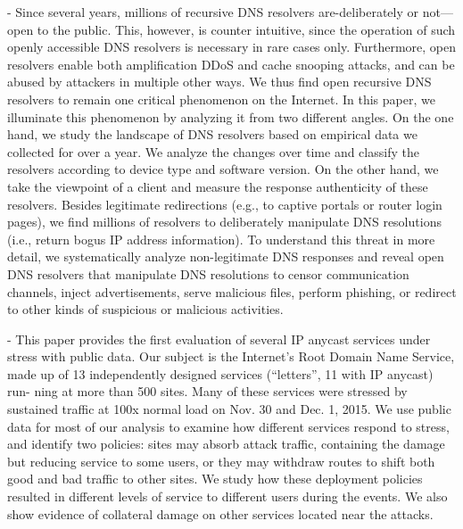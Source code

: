 \cite{kuhrer2015going} - Since several years, millions of recursive DNS resolvers are-deliberately or not—open to the public. This, however, is counter intuitive, since the operation of such openly accessible DNS resolvers is necessary in rare cases only. Furthermore, open resolvers enable both amplification DDoS and cache snooping attacks, and can be abused by attackers in multiple other ways. We thus find open recursive DNS resolvers to remain one critical phenomenon on the Internet. In this paper, we illuminate this phenomenon by analyzing it from two different angles. On the one hand, we study the landscape of DNS resolvers based on empirical data we collected for over a year. We analyze the changes over time and classify the resolvers according to device type and software version. On the other hand, we take the viewpoint of a client and measure the response authenticity of these resolvers. Besides legitimate redirections (e.g., to captive portals or router login pages), we find millions of resolvers to deliberately manipulate DNS resolutions (i.e., return bogus IP address information). To understand this threat in more detail, we systematically analyze non-legitimate DNS responses and reveal open DNS resolvers that manipulate DNS resolutions to censor communication channels, inject advertisements, serve malicious files, perform phishing, or redirect to other kinds of suspicious or malicious activities.

\cite{moura2016anycast} - This paper provides the first evaluation of several IP anycast services under stress with public data. Our subject is the Internet’s Root Domain Name Service, made up of 13 independently designed services (“letters”, 11 with IP anycast) run- ning at more than 500 sites. Many of these services were stressed by sustained traffic at 100x normal load on Nov. 30 and Dec. 1, 2015. We use public data for most of our analysis to examine how different services respond to stress, and identify two policies: sites may absorb attack traffic, containing the damage but reducing service to some users, or they may withdraw routes to shift both good and bad traffic to other sites. We study how these deployment policies resulted in different levels of service to different users during the events. We also show evidence of collateral damage on other services located near the attacks.

